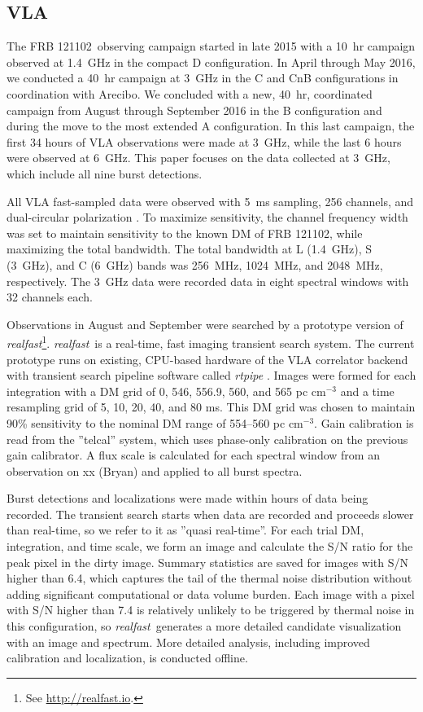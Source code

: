 \documentclass[twocolumn]{aastex61}
\newcommand{\rf}{\emph{realfast}}
\newcommand{\frb}{FRB 121102}
\begin{document}
\subsection{VLA}
The \frb\ observing campaign started in late 2015 with a 10~hr campaign observed at 1.4~GHz in the compact D configuration. In April through May 2016, we conducted a 40~hr campaign at 3~GHz in the C and CnB configurations in coordination with Arecibo. We concluded with a new, 40~hr, coordinated campaign from August through September 2016 in the B configuration and during the move to the most extended A configuration. In this last campaign, the first 34 hours of VLA observations were made at 3~GHz, while the last 6 hours were observed at 6~GHz. This paper focuses on the data collected at 3~GHz, which include all nine burst detections.

All VLA fast-sampled data were observed with 5~ms sampling, 256 channels, and dual-circular polarization \citep[as in]{2015ApJ...807...16L}. To maximize sensitivity, the channel frequency width was set to maintain sensitivity to the known DM of \frb, while maximizing the total bandwidth. The total bandwidth at L (1.4~GHz), S (3~GHz), and C (6~GHz) bands was 256~MHz, 1024~MHz, and 2048~MHz, respectively. The 3~GHz data were recorded data in eight spectral windows with 32 channels each.

Observations in August and September were searched by a prototype version of \rf\footnote{See \url{http://realfast.io}.}. \rf\ is a real-time, fast imaging transient search system. The current prototype runs on existing, CPU-based hardware of the VLA correlator backend with transient search pipeline software called \emph{rtpipe} \citep[\url{https://github.com/caseyjlaw/rtpipe};][]{2015ApJ...807...16L}. Images were formed for each integration with a DM grid of 0, 546, 556.9, 560, and 565 pc cm$^{-3}$ and a time resampling grid of 5, 10, 20, 40, and 80 ms. This DM grid was chosen to maintain 90\% sensitivity to the nominal DM range of 554--560 pc cm$^{-3}$. Gain calibration is read from the ''telcal'' system, which uses phase-only calibration on the previous gain calibrator. A flux scale is calculated for each spectral window from an observation on {\color{red}xx (Bryan)} and applied to all burst spectra.

Burst detections and localizations were made within hours of data being recorded. The transient search starts when data are recorded and proceeds slower than real-time, so we refer to it as ''quasi real-time''. For each trial DM, integration, and time scale, we form an image and calculate the S/N ratio for the peak pixel in the dirty image. Summary statistics are saved for images with S/N higher than 6.4, which captures the tail of the thermal noise distribution without adding significant computational or data volume burden. Each image with a pixel with S/N higher than 7.4 is relatively unlikely to be triggered by thermal noise in this configuration, so \rf\ generates a more detailed candidate visualization with an image and spectrum. More detailed analysis, including improved calibration and localization, is conducted offline. 
\end{document}

